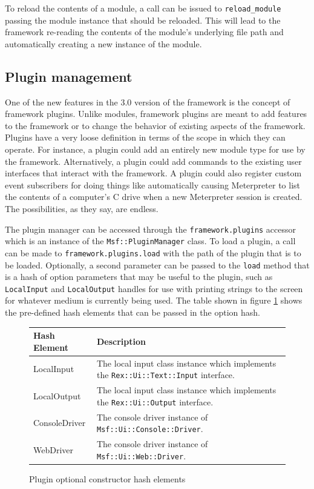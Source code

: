 \documentclass{report}
\begin{document}
\par
To reload the contents of a module, a call can be issued to
\texttt{reload\_module} passing the module instance that should be
reloaded.  This will lead to the framework re-reading the contents
of the module's underlying file path and automatically creating a
new instance of the module.

        \subsection{Plugin management}

\par
One of the new features in the 3.0 version of the framework is the
concept of framework plugins.  Unlike modules, framework plugins are
meant to add features to the framework or to change the behavior of
existing aspects of the framework.  Plugins have a very loose
definition in terms of the scope in which they can operate.  For
instance, a plugin could add an entirely new module type for use by
the framework.  Alternatively, a plugin could add commands to the
existing user interfaces that interact with the framework.  A plugin
could also register custom event subscribers for doing things like
automatically causing Meterpreter to list the contents of a
computer's C drive when a new Meterpreter session is created.  The
possibilities, as they say, are endless.

\par
The plugin manager can be accessed through the
\texttt{framework.plugins} accessor which is an instance of the
\texttt{Msf::PluginManager} class. To load a plugin, a call can be
made to \texttt{framework.plugins.load} with the path of the plugin
that is to be loaded.  Optionally, a second parameter can be passed
to the \texttt{load} method that is a hash of option parameters that
may be useful to the plugin, such as \texttt{LocalInput} and
\texttt{LocalOutput} handles for use with printing strings to the
screen for whatever medium is currently being used.  The table shown
in figure \ref{fig-table-plugin-hash} shows the pre-defined hash
elements that can be passed in the option hash.

\begin{figure}[h]
\begin{center}
\begin{tabular}{|l|p{3.5in}|}
\hline
\textbf{Hash Element} & \textbf{Description} \\
\hline
LocalInput & The local input class instance which implements the \texttt{Rex::Ui::Text::Input} interface. \\
\hline
LocalOutput & The local input class instance which implements the \texttt{Rex::Ui::Output} interface. \\
\hline
ConsoleDriver & The console driver instance of \texttt{Msf::Ui::Console::Driver}. \\
\hline
WebDriver & The console driver instance of \texttt{Msf::Ui::Web::Driver}. \\
\hline
\end{tabular}
\caption{Plugin optional constructor hash elements}
\label{fig-table-plugin-hash}
\end{center}
\end{figure}
\end{document}
